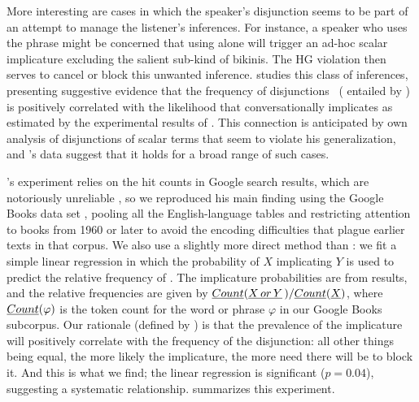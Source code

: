\documentclass[12pt,twoside]{article}
\renewcommand{\_}{\textbf{\textunderscore\hspace{-4pt}\textunderscore\hspace{-3pt}\textunderscore\hspace{-4pt}\textunderscore}\hspace{0.5pt}}			%
\begin{document}
More interesting are cases in which the speaker's disjunction seems to
be part of an attempt to manage the listener's inferences. For
instance, a speaker who uses the phrase 
might be concerned that using  alone will trigger an
ad-hoc scalar implicature \citep{Hirschberg85} excluding the salient
sub-kind of bikinis. The HG violation then serves to cancel or block
this unwanted inference. \citet{Chemla-HurfordCounts} studies this
class of inferences, presenting suggestive evidence that the frequency
of disjunctions \XorY\ ( entailed by ) is positively
correlated with the likelihood that  conversationally
implicates  as estimated by the experimental results of
\citet{vanTiel-etal:2013}. This connection is anticipated by
 own analysis of disjunctions of scalar terms
that seem to violate his generalization, and
\citeauthor{Chemla-HurfordCounts}'s data suggest that it holds for a
broad range of such cases.

\newcommand{\CountGB}{\emph{Count}}

\citeauthor{Chemla-HurfordCounts}'s experiment relies on the hit
counts in Google search results, which are notoriously unreliable
\citep{Liberman:2005}, so we reproduced his main finding using the
Google Books data set \citep{Michel-etal:2011}, pooling all the
English-language tables and restricting attention to books from 1960
or later to avoid the encoding difficulties that plague earlier texts
in that corpus. We also use a slightly more direct method than
\citeauthor{Chemla-HurfordCounts}: we fit a simple linear regression
in which the probability of $X$ implicating $Y$ is used to predict the
relative frequency of \XorY. The implicature probabilities are
from  results, and the relative
frequencies are given by
$\CountGB(\XorY\,)/\CountGB(\word{X\/})$, where
$\CountGB(\varphi)$ is the token count for the word or phrase
$\varphi$ in our Google Books subcorpus. Our rationale (defined by
\citeauthor{Chemla-HurfordCounts}) is that the prevalence of the
implicature will positively correlate with the frequency of the
disjunction: all other things being equal, the more likely the
implicature, the more need there will be to block it. And this is what
we find; the linear regression is significant ($p = 0.04$), suggesting
a systematic relationship.  summarizes this
experiment.
\end{document}
